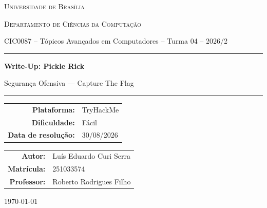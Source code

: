 \documentclass[12pt,a4paper]{article}
\newcommand{\desafioNome}{Pickle Rick}
\newcommand{\plataforma}{TryHackMe}
\newcommand{\dificuldade}{Fácil}
\newcommand{\dataResolucao}{30/08/2026}
\newcommand{\autorNome}{Luís Eduardo Curi Serra}
\newcommand{\materia}{CIC0087 -- Tópicos Avançados em Computadores -- Turma 04 -- 2026/2}
\newcommand{\departamento}{Departamento de Ciências da Computação}
\newcommand{\matricula}{251033574}
\newcommand{\professor}{Roberto Rodrigues Filho}
\newcommand{\universidade}{Universidade de Brasília}
\begin{document}
\begin{titlepage}
  \thispagestyle{empty}
  \centering
  {\scshape \universidade \par}
  {\scshape \departamento \par}
  \vspace{0.4cm}
  {\small \materia \par}
  \vspace{2.5cm}

  \rule{\linewidth}{0.4pt}\par
  \vspace{0.6cm}
  {\huge \bfseries Write-Up: \desafioNome \par}
  \vspace{0.4cm}
  {\large Segurança Ofensiva --- Capture The Flag \par}
  \vspace{0.6cm}
  \rule{\linewidth}{0.4pt}\par

  \vspace{2.0cm}
  \begin{tabular}{rl}
    \textbf{Plataforma:}       & \plataforma       \\[4pt]
    \textbf{Dificuldade:}      & \dificuldade      \\[4pt]
    \textbf{Data de resolução:}& \dataResolucao    \\
  \end{tabular}

  \vfill

  \begin{tabular}{rl}
    \textbf{Autor:}     & \autorNome  \\[4pt]
    \textbf{Matrícula:} & \matricula  \\[4pt]
    \textbf{Professor:} & \professor  \\
  \end{tabular}

  \vspace{1.2cm}
  {\small \today \par}
\end{titlepage}

\newpage
\tableofcontents
\thispagestyle{fancy}
\newpage

\end{document}
